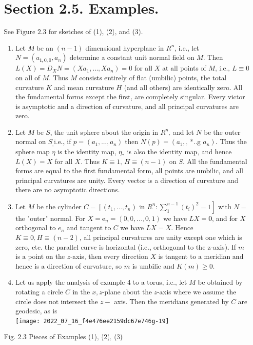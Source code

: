 \documentclass[10pt]{article}
\begin{document}
\section{Section 2.5. Examples.}
See Figure $2.3$ for sketches of (1), (2), and (3).

\begin{enumerate}
  \item Let $M$ be an $(n-1)$ dimensional hyperplane in $R^{n}$, i.e., let $N=\left(a_{1,0,0}, a_{n}\right)$ determine a constant unit normal field on $M$. Then $L(X)=D_{X} N=\left(X a_{1}, \ldots, X a_{n}\right)=0$ for all $X$ at all points of $M$, i.e., $L \equiv 0$ on all of $M$. Thus $M$ consists entirely of flat (umbilic) points, the total curvature $K$ and mean curvature $H$ (and all others) are identically zero. All the fundamental forms except the first, are completely singular. Every victor is asymptotic and a direction of curvature, and all principal curvatures are zero.

  \item Let $M$ be $S$, the unit sphere about the origin in $R^{n}$, and let $N$ be the outer normal on $S_{,}$i.e., if $p=\left(a_{1}, \ldots, a_{n}\right)$ then $N(p)=\left(a_{1},\right.$, *..g $\left.a_{n}\right)$. Thus the sphere map $\eta$ is the identity map, $\eta_{*}$ is also the identity map, and hence $L(X)=X$ for all $X$. Thus $K \equiv 1$, $H \equiv(n-1)$ on $S .$ All the fundamental forms are equal to the first fundamental form, all points are umbilic, and all principal curvatures are unity. Every vector is a direction of curvature and there are no asymptotic directions.

  \item Let $M$ be the cylinder $C=\left[\left(t_{1}, \ldots, t_{n}\right)\right.$ in $\left.R^{n}: \sum_{1}^{n-1}\left(t_{i}\right)^{2}=1\right]$ with $N=$ the "outer" normal. For $X=\mathrm{e}_{n}=(0,0, \ldots, 0,1)$ we have $L X=0$, and for $X$ orthogonal to $e_{n}$ and tangent to $C$ we have $L X=X$. Hence $K \equiv 0, H \equiv(n-2)$, all principal curvatures are unity except one which is zero, etc. the parallel curve is horizontal (i.e., orthogonal to the z-axis). If $m$ is a point on the $z$-axis, then every direction $X$ is tangent to a meridian and hence is a direction of curvature, so $m$ is umbilic and $K(m) \geq 0$.

  \item Let us apply the analysis of example 4 to a torus, i.e., let $M$ be obtained by rotating a circle $C$ in the $x, z$-plane about the $z$-axis where we assume the circle does not intersect the $z-$ axis. Then the meridians generated by $C$ are geodesic, as is\\

\texttt{[image: 2022\_07\_16\_f4e476ee2159dc67e746g-19]}

\end{enumerate}
Fig. $2.3$ Pieces of Examples (1), (2), (3)
\end{document}
